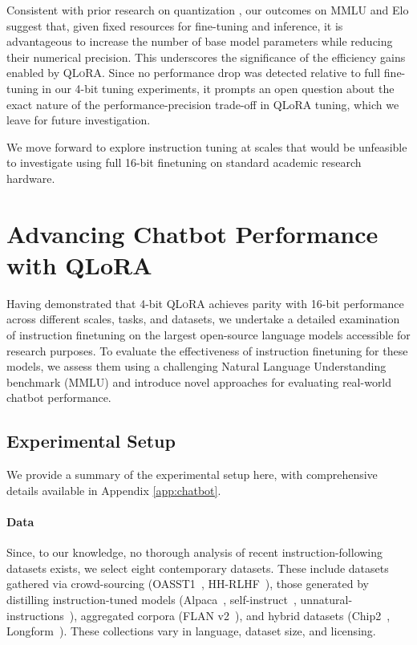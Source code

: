 Consistent with prior research on quantization \citep{dettmers2022case}, our outcomes on MMLU and Elo suggest that, given fixed resources for fine-tuning and inference, it is advantageous to increase the number of base model parameters while reducing their numerical precision. This underscores the significance of the efficiency gains enabled by \textsc{QLoRA}. Since no performance drop was detected relative to full fine-tuning in our 4-bit tuning experiments, it prompts an open question about the exact nature of the performance-precision trade-off in QLoRA tuning, which we leave for future investigation.

We move forward to explore instruction tuning at scales that would be unfeasible to investigate using full 16-bit finetuning on standard academic research hardware.

\section{Advancing Chatbot Performance with QLoRA}
\label{sec:pushing}
Having demonstrated that 4-bit \textsc{QLoRA} achieves parity with 16-bit performance across different scales, tasks, and datasets, we undertake a detailed examination of instruction finetuning on the largest open-source language models accessible for research purposes. To evaluate the effectiveness of instruction finetuning for these models, we assess them using a challenging Natural Language Understanding benchmark (MMLU) and introduce novel approaches for evaluating real-world chatbot performance.

\subsection{Experimental Setup} We provide a summary of the experimental setup here, with comprehensive details available in Appendix \ref{app:chatbot}.

\paragraph{Data} Since, to our knowledge, no thorough analysis of recent instruction-following datasets exists, we select eight contemporary datasets. These include datasets gathered via crowd-sourcing (OASST1~\citep{kopf2023openassistant}, HH-RLHF~\citep{bai2022training}), those generated by distilling instruction-tuned models (Alpaca~\citep{alpaca}, self-instruct~\citep{wang2022self}, unnatural-instructions~\citep{honovich2022unnatural}), aggregated corpora (FLAN v2~\citep{chung2022scaling}), and hybrid datasets (Chip2~\citep{laion2023}, Longform~\citep{koksal2023longform}). These collections vary in language, dataset size, and licensing.


